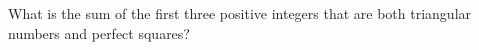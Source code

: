 What is the sum of the first three positive integers that are both triangular numbers and perfect squares?
